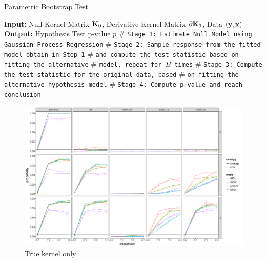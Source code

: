 \documentclass[11pt]{article}
\begin{document}
\begin{algorithm}
\caption{Parametric Bootstrap Test} 
\label{alg:cvek}
\begin{algorithmic}[1]
\newline
\textbf{Input:} Null Kernel Matrix ${\bf K}_0$, Derivative Kernel Matrix $\partial {\bf K}_0$, Data $({\bf y}, {\bf x})$\newline
\textbf{Output:} Hypothesis Test p-value $p$\newline
$\#$ \texttt{Stage 1: Estimate Null Model using Gaussian Process Regression}
\newline
$\#$ \texttt{Stage 2: Sample response from the fitted model obtain in Step 1}
\newline
$\#$ \texttt{and compute the test statistic based on fitting the alternative}
\newline
$\#$ \texttt{model, repeat for $B$ times}
\EndFor 
\newline
$\#$ \texttt{Stage 3: Compute the test statistic for the original data, based}
\newline
$\#$ \texttt{on fitting the alternative hypothesis model}
\newline
$\#$ \texttt{Stage 4: Compute p-value and reach conclusion}
\EndProcedure
\end{algorithmic}
\end{algorithm}

\clearpage


\begin{figure}
\begin{center}
\includegraphics[width=0.9\columnwidth]{L1} 
\caption{True kernel only}
\label{fig:res}
\end{center}
\end{figure}
\end{document}
